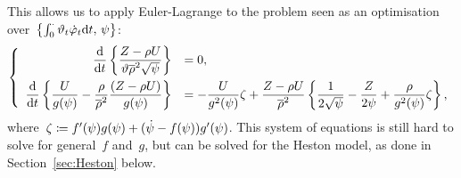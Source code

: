 This allows us to apply Euler-Lagrange to the problem seen as an optimisation over~$\left\{\int_0^\cdot \vartheta_t \dot{\varphi}_t \mathrm{d} t,\,\psi\right\}$:
\begin{equation}\label{eq:LDPLargeTimeGeneral}
\left\{
\begin{array}{rl}
\displaystyle \frac{\mathrm{d}}{\mathrm{d} t}\left\{
\frac{Z - \rho U}{\vartheta \overline{\rho}^2\sqrt{\psi}} \right\} &= 0, \\[10pt]
\displaystyle \frac{\mathrm{d}}{\mathrm{d} t}\left\{ \frac{U}{g(\psi)} - \frac{\rho}{\overline{\rho}^2}\frac{(Z - \rho U)}{g(\psi)} \right\}
&= \displaystyle - \frac{U}{g^2(\psi)}\zeta + \frac{Z-\rho U}{\overline{\rho}^2}\left\{ \frac{1}{2\sqrt{\psi}} - \frac{Z}{2\psi} + \frac{\rho}{g^2(\psi)}\zeta \right\},
\end{array}
\right.
\end{equation}
where~$\zeta \coloneqq f'(\psi)g(\psi) + (\dot{\psi}-f(\psi))g'(\psi)$. This system of equations is still hard to solve for general~$f$ and~$g$, 
but can be solved for the Heston model,
as done in Section~\ref{sec:Heston} below.

